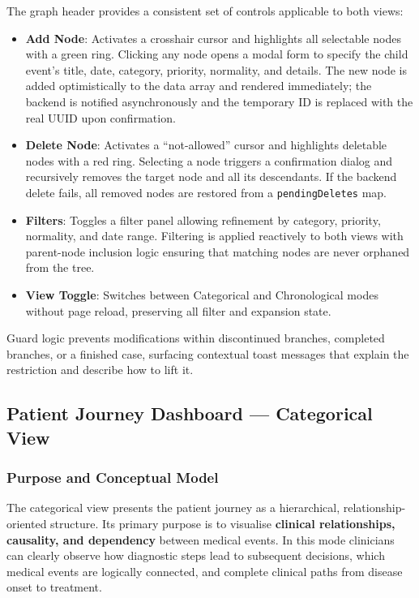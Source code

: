The graph header provides a consistent set of controls applicable to both
views:
\begin{itemize}
    \item \textbf{Add Node}: Activates a crosshair cursor and highlights all
          selectable nodes with a green ring. Clicking any node opens a modal
          form to specify the child event's title, date, category, priority,
          normality, and details. The new node is added optimistically to the
          data array and rendered immediately; the backend is notified
          asynchronously and the temporary ID is replaced with the real UUID
          upon confirmation.
    \item \textbf{Delete Node}: Activates a ``not-allowed'' cursor and highlights
          deletable nodes with a red ring. Selecting a node triggers a
          confirmation dialog and recursively removes the target node and all
          its descendants. If the backend delete fails, all removed nodes are
          restored from a \texttt{pendingDeletes} map.
    \item \textbf{Filters}: Toggles a filter panel allowing refinement by
          category, priority, normality, and date range. Filtering is applied
          reactively to both views with parent-node inclusion logic ensuring
          that matching nodes are never orphaned from the tree.
    \item \textbf{View Toggle}: Switches between Categorical and Chronological
          modes without page reload, preserving all filter and expansion state.
\end{itemize}

Guard logic prevents modifications within discontinued branches, completed
branches, or a finished case, surfacing contextual toast messages that explain
the restriction and describe how to lift it.

\subsection{Patient Journey Dashboard — Categorical View}

\subsubsection{Purpose and Conceptual Model}

The categorical view presents the patient journey as a hierarchical,
relationship-oriented structure. Its primary purpose is to visualise
\textbf{clinical relationships, causality, and dependency} between medical
events. In this mode clinicians can clearly observe how diagnostic steps lead
to subsequent decisions, which medical events are logically connected, and
complete clinical paths from disease onset to treatment.

